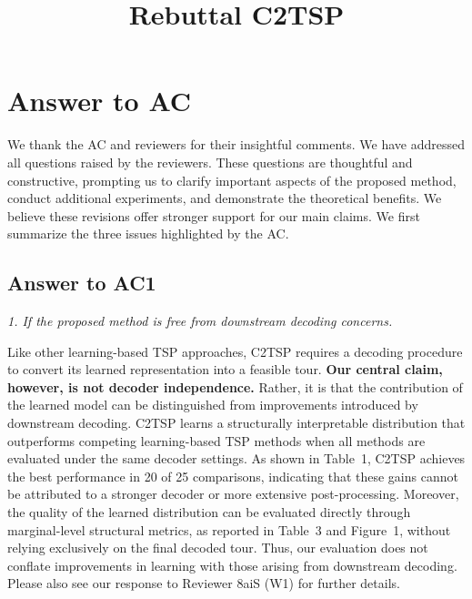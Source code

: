 \documentclass[10pt]{article}
\title{Rebuttal C2TSP}
\author{}
\date{}
\begin{document}
\maketitle

\section{Answer to AC}

We thank the AC and reviewers for their insightful comments. We have addressed all questions raised by the reviewers. These questions are thoughtful and constructive, prompting us to clarify important aspects of the proposed method, conduct additional experiments, and demonstrate the theoretical benefits. We believe these revisions offer stronger support for our main claims. We first summarize the three issues highlighted by the AC.

\subsection{Answer to AC1}

\textit{1. If the proposed method is free from downstream decoding concerns.}

Like other learning-based TSP approaches, C2TSP requires a decoding procedure to convert its learned representation into a feasible tour.  \textbf{Our central claim, however, is not decoder independence. }Rather, it is that the contribution of the learned model can be distinguished from improvements introduced by downstream decoding. C2TSP learns a structurally interpretable distribution that outperforms competing learning-based TSP methods when all methods are evaluated under the same decoder settings. As shown in Table~1, C2TSP achieves the best performance in 20 of 25 comparisons, indicating that these gains cannot be attributed to a stronger decoder or more extensive post-processing. Moreover, the quality of the learned distribution can be evaluated directly through marginal-level structural metrics, as reported in Table~3 and Figure~1, without relying exclusively on the final decoded tour. Thus, our evaluation does not conflate improvements in learning with those arising from downstream decoding. Please also see our response to Reviewer 8aiS (W1) for further details.


\end{document}
